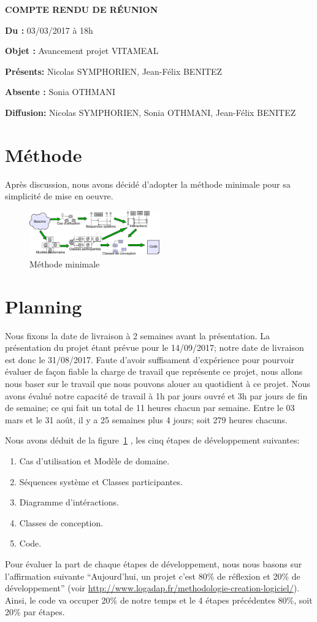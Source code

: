 \documentclass[11pt,a4paper,french,twoside,openright]{article}
\begin{document}
\pagestyle{fancy}

\begin{center}\bfseries\Huge
COMPTE RENDU DE RÉUNION
\end{center}

\textbf{Du      :} 03/03/2017 à 18h

\textbf{Objet   :} Avancement projet VITAMEAL

\textbf{Présents:} Nicolas SYMPHORIEN, Jean-Félix BENITEZ

\textbf{Absente :} Sonia OTHMANI

\textbf{Diffusion:} Nicolas SYMPHORIEN, Sonia OTHMANI, Jean-Félix BENITEZ

\hrulefill

\section{Méthode}
Après discussion, nous avons décidé d'adopter la méthode minimale pour sa simplicité de mise en oeuvre.
\begin{figure}[!ht]
\label{Mmin}
  \centering
      \includegraphics[width=0.5\textwidth]{MethodeMinimale}
\caption{Méthode minimale}
\end{figure}

\section{Planning}
Nous fixons la date de livraison à 2 semaines avant la présentation. La présentation du projet étant prévue pour le 14/09/2017; notre date de livraison est donc le 31/08/2017. Faute d'avoir suffisament d'expérience pour pourvoir évaluer de façon fiable la charge de travail que représente ce projet, nous allons nous baser sur le travail que nous pouvons alouer au quotidient à ce projet. Nous avons évalué notre capacité de travail à 1h par jours ouvré et 3h par jours de fin de semaine; ce qui fait un total de 11 heures chacun par semaine. Entre le 03 mars et le 31 août, il y a 25 semaines plus 4 jours; soit 279 heures chacuns.

Nous avons déduit de la figure~\ref{Mmin} , les cinq étapes de développement suivantes:
\begin{enumerate}
\item Cas d'utilisation et Modèle de domaine.
\item Séquences système et Classes participantes.
\item Diagramme d'intéractions.
\item Classes de conception.
\item Code.
\end{enumerate}
Pour évaluer la part de chaque étapes de développement, nous nous basons sur l'affirmation suivante \enquote{Aujourd'hui, un projet c'est 80\% de réflexion et 20\% de développement} (voir \url{http://www.logadap.fr/methodologie-creation-logiciel/}). Ainsi, le code va occuper 20\% de notre temps et le 4 étapes précédentes 80\%, soit 20\% par étapes.
\end{document}

